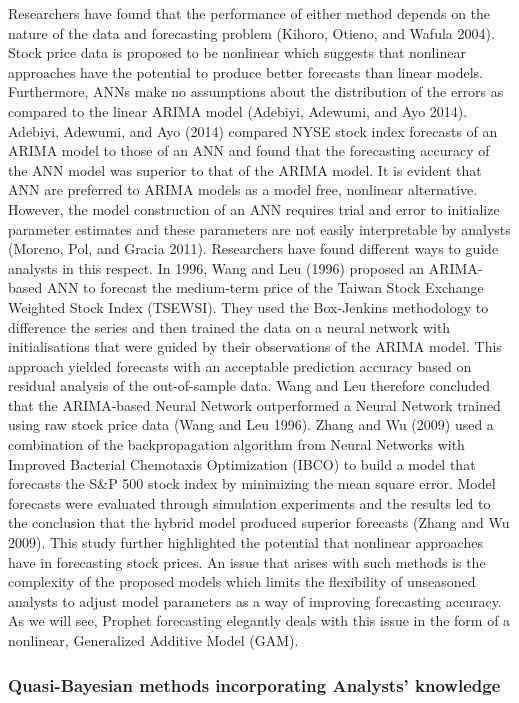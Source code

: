 \documentclass[12pt,a4paper]{article}
\numberwithin{equation}{section}
\numberwithin{figure}{section}
\numberwithin{table}{section}
\begin{document}
Researchers have found that the performance of either method depends on
the nature of the data and forecasting problem (Kihoro, Otieno, and
Wafula 2004). Stock price data is proposed to be nonlinear which
suggests that nonlinear approaches have the potential to produce better
forecasts than linear models. Furthermore, ANNs make no assumptions
about the distribution of the errors as compared to the linear ARIMA
model (Adebiyi, Adewumi, and Ayo 2014). Adebiyi, Adewumi, and Ayo (2014)
compared NYSE stock index forecasts of an ARIMA model to those of an ANN
and found that the forecasting accuracy of the ANN model was superior to
that of the ARIMA model. It is evident that ANN are preferred to ARIMA
models as a model free, nonlinear alternative. However, the model
construction of an ANN requires trial and error to initialize parameter
estimates and these parameters are not easily interpretable by analysts
(Moreno, Pol, and Gracia 2011). Researchers have found different ways to
guide analysts in this respect. In 1996, Wang and Leu (1996) proposed an
ARIMA-based ANN to forecast the medium-term price of the Taiwan Stock
Exchange Weighted Stock Index (TSEWSI). They used the Box-Jenkins
methodology to difference the series and then trained the data on a
neural network with initialisations that were guided by their
observations of the ARIMA model. This approach yielded forecasts with an
acceptable prediction accuracy based on residual analysis of the
out-of-sample data. Wang and Leu therefore concluded that the
ARIMA-based Neural Network outperformed a Neural Network trained using
raw stock price data (Wang and Leu 1996). Zhang and Wu (2009) used a
combination of the backpropagation algorithm from Neural Networks with
Improved Bacterial Chemotaxis Optimization (IBCO) to build a model that
forecasts the S\&P 500 stock index by minimizing the mean square error.
Model forecasts were evaluated through simulation experiments and the
results led to the conclusion that the hybrid model produced superior
forecasts (Zhang and Wu 2009). This study further highlighted the
potential that nonlinear approaches have in forecasting stock prices. An
issue that arises with such methods is the complexity of the proposed
models which limits the flexibility of unseasoned analysts to adjust
model parameters as a way of improving forecasting accuracy. As we will
see, Prophet forecasting elegantly deals with this issue in the form of
a nonlinear, Generalized Additive Model (GAM).

\subsubsection{Quasi-Bayesian methods incorporating Analysts'
knowledge}\label{quasi-bayesian-methods-incorporating-analysts-knowledge}
\end{document}
